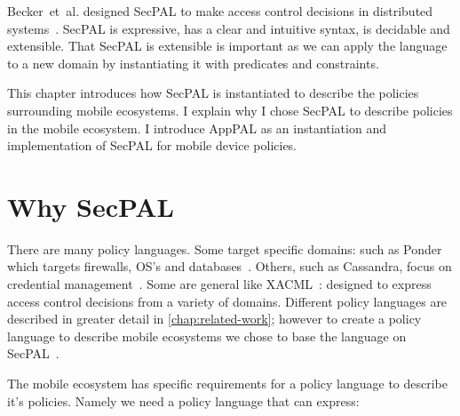 \documentclass[thesis.tex]{subfiles}
\begin{document}
Becker~et~al{.} designed SecPAL to make access control decisions in distributed
systems~\cite{becker_secpal:_2006}. SecPAL is expressive, has a clear and
intuitive syntax, is decidable and extensible. That SecPAL is extensible is
important as we can apply the language to a new domain by instantiating it with
predicates and constraints.

This chapter introduces how SecPAL is instantiated to describe the policies
surrounding mobile ecosystems. I explain why I chose SecPAL to describe policies
in the mobile ecosystem. I introduce AppPAL as an instantiation and
implementation of SecPAL for mobile device policies.

\section{Why SecPAL}
\label{sec:why-apppal}

There are many policy languages. Some target specific domains: such as Ponder
which targets firewalls, OS's and databases~\cite{damianou_ponder_2001}. Others,
such as Cassandra, focus on credential management~\cite{becker_cassandra:_2004}.
Some are general like XACML~\cite{oasis_extensible_2013}: designed to express
access control decisions from a variety of domains. Different policy languages
are described in greater detail in \autoref{chap:related-work}; however to
create a policy language to describe mobile ecosystems we chose to base the
language on SecPAL~\cite{becker_secpal:_2006}.

The mobile ecosystem has specific requirements for a policy language to describe
it's policies. Namely we need a policy language that can express:
\end{document}
